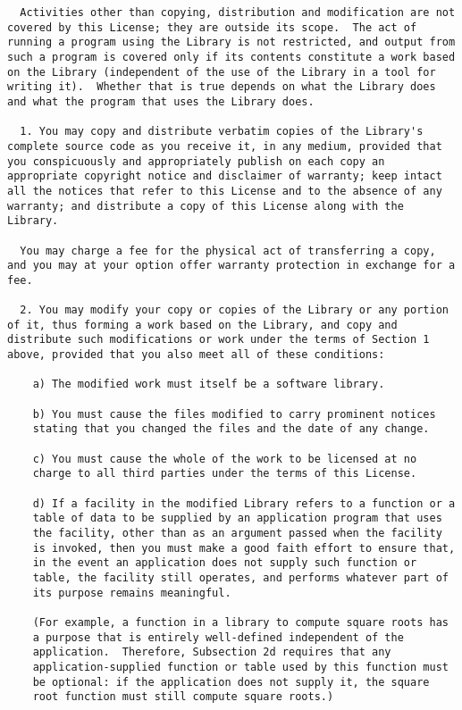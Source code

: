 \documentclass{InsightBook}
\begin{document}
\begin{verbatim}
  Activities other than copying, distribution and modification are not
covered by this License; they are outside its scope.  The act of
running a program using the Library is not restricted, and output from
such a program is covered only if its contents constitute a work based
on the Library (independent of the use of the Library in a tool for
writing it).  Whether that is true depends on what the Library does
and what the program that uses the Library does.
  
  1. You may copy and distribute verbatim copies of the Library's
complete source code as you receive it, in any medium, provided that
you conspicuously and appropriately publish on each copy an
appropriate copyright notice and disclaimer of warranty; keep intact
all the notices that refer to this License and to the absence of any
warranty; and distribute a copy of this License along with the
Library.

  You may charge a fee for the physical act of transferring a copy,
and you may at your option offer warranty protection in exchange for a
fee.

  2. You may modify your copy or copies of the Library or any portion
of it, thus forming a work based on the Library, and copy and
distribute such modifications or work under the terms of Section 1
above, provided that you also meet all of these conditions:

    a) The modified work must itself be a software library.

    b) You must cause the files modified to carry prominent notices
    stating that you changed the files and the date of any change.

    c) You must cause the whole of the work to be licensed at no
    charge to all third parties under the terms of this License.

    d) If a facility in the modified Library refers to a function or a
    table of data to be supplied by an application program that uses
    the facility, other than as an argument passed when the facility
    is invoked, then you must make a good faith effort to ensure that,
    in the event an application does not supply such function or
    table, the facility still operates, and performs whatever part of
    its purpose remains meaningful.

    (For example, a function in a library to compute square roots has
    a purpose that is entirely well-defined independent of the
    application.  Therefore, Subsection 2d requires that any
    application-supplied function or table used by this function must
    be optional: if the application does not supply it, the square
    root function must still compute square roots.)


\end{verbatim}
\end{document}
